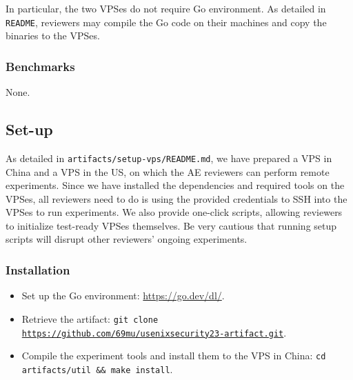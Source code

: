 In particular, the two VPSes do not require Go environment. 
As detailed in \texttt{README},
reviewers may compile the Go code on their machines and copy the binaries to the VPSes.

\subsubsection{Benchmarks}
None.

\subsection{Set-up}


As detailed in \texttt{artifacts/setup-vps/README.md}, 
we have prepared a VPS in China and a VPS in the US,
on which the AE reviewers can perform remote experiments.
Since we have installed the dependencies and required tools on the VPSes,
all reviewers need to do is using the provided credentials to SSH into the VPSes
to run experiments.
We also provide one-click scripts, allowing reviewers to initialize test-ready VPSes themselves.
Be very cautious that running setup scripts will disrupt other reviewers' ongoing experiments.

\subsubsection{Installation}

\begin{itemize}
    \item Set up the Go environment: \url{https://go.dev/dl/}.
    \item Retrieve the artifact:
    \texttt{git clone \url{https://github.com/69mu/usenixsecurity23-artifact.git}}.
    \item Compile the experiment tools and install them to the VPS in China:
    \texttt{cd artifacts/util \&\& make install}.
\end{itemize}

